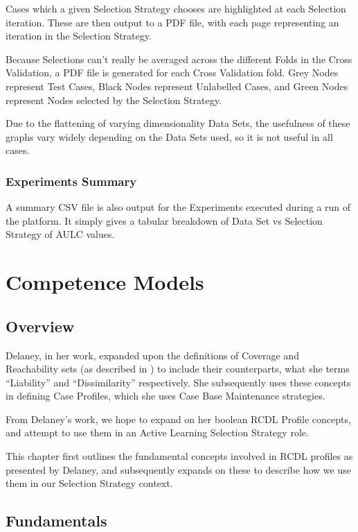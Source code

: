 \documentclass[a4paper,11pt]{report}
\begin{document}
Cases which a given Selection Strategy chooses are highlighted at each Selection iteration. These are then output to a PDF file, with each page representing an iteration in the Selection Strategy.

Because Selections can't really be averaged across the different Folds in the Cross Validation, a PDF file is generated for each Cross Validation fold. Grey Nodes represent Test Cases, Black Nodes represent Unlabelled Cases, and Green Nodes represent Nodes selected by the Selection Strategy.

Due to the flattening of varying dimensionality Data Sets, the usefulness of these graphs vary widely depending on the Data Sets used, so it is not useful in all cases.

\subsection{Experiments Summary}
A summary CSV file is also output for the Experiments executed during a run of the platform. It simply gives a tabular breakdown of Data Set vs Selection Strategy of AULC values.

\chapter{Competence Models\label{cha:CompetenceModels}}
\section{Overview}

Delaney, in her work, expanded upon the definitions of Coverage and Reachability sets (as described in \citet{Smyth1995}) to include their counterparts, what she terms ``Liability'' and ``Dissimilarity'' respectively\citep{Delany2009}. She subsequently uses these concepts in defining Case Profiles, which she uses Case Base Maintenance strategies.

From Delaney's work, we hope to expand on her boolean RCDL Profile concepts, and attempt to use them in an Active Learning Selection Strategy role.

This chapter first outlines the fundamental concepts involved in RCDL profiles as presented by Delaney, and subsequently expands on these to describe how we use them in our Selection Strategy context.

\section{Fundamentals}
\end{document}

